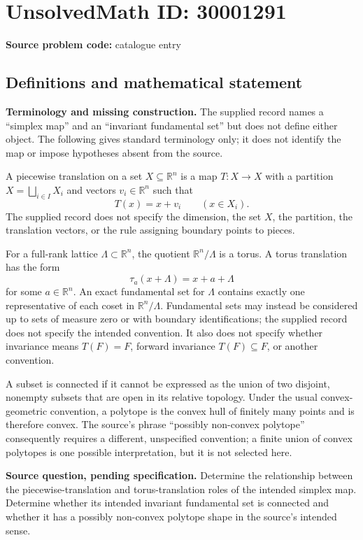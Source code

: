 \documentclass[11pt]{article}
\newcommand{\R}{\mathbb{R}}
\begin{document}
\section*{UnsolvedMath ID: 30001291}
\textbf{Source problem code:} catalogue entry
\subsection{Definitions and mathematical statement}
\textbf{Terminology and missing construction.} The supplied record names a ``simplex map'' and an ``invariant fundamental set'' but does not define either object. The following gives standard terminology only; it does not identify the map or impose hypotheses absent from the source.

A piecewise translation on a set \(X\subseteq\R^n\) is a map \(T:X\to X\) with a partition \(X=\bigsqcup_{i\in I}X_i\) and vectors \(v_i\in\R^n\) such that
\[
T(x)=x+v_i\qquad(x\in X_i).
\]
The supplied record does not specify the dimension, the set \(X\), the partition, the translation vectors, or the rule assigning boundary points to pieces.

For a full-rank lattice \(\Lambda\subset\R^n\), the quotient \(\R^n/\Lambda\) is a torus. A torus translation has the form
\[
\tau_a(x+\Lambda)=x+a+\Lambda
\]
for some \(a\in\R^n\). An exact fundamental set for \(\Lambda\) contains exactly one representative of each coset in \(\R^n/\Lambda\). Fundamental sets may instead be considered up to sets of measure zero or with boundary identifications; the supplied record does not specify the intended convention. It also does not specify whether invariance means \(T(F)=F\), forward invariance \(T(F)\subseteq F\), or another convention.

A subset is connected if it cannot be expressed as the union of two disjoint, nonempty subsets that are open in its relative topology. Under the usual convex-geometric convention, a polytope is the convex hull of finitely many points and is therefore convex. The source's phrase ``possibly non-convex polytope'' consequently requires a different, unspecified convention; a finite union of convex polytopes is one possible interpretation, but it is not selected here.

\textbf{Source question, pending specification.} Determine the relationship between the piecewise-translation and torus-translation roles of the intended simplex map. Determine whether its intended invariant fundamental set is connected and whether it has a possibly non-convex polytope shape in the source's intended sense.
\end{document}
